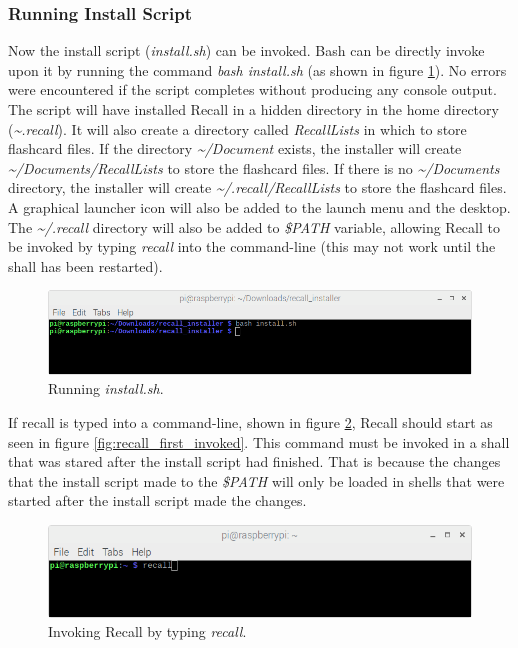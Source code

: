 \documentclass[letterpaper]{article}
\begin{document}
\subsubsection{Running Install Script} \label{running install script in terminal}
Now the install script (\textit{install.sh}) can be invoked. Bash can be directly invoke upon it by running the command \textit{bash install.sh} (as shown in figure \ref{fig:run_bash_install}). No errors were encountered if the script completes without producing any console output. The script will have installed Recall in a hidden directory in the home directory (\textit{\~{}.recall}). It will also create a directory called \textit{RecallLists} in which to store flashcard files. If the directory \textit{\~{}/Document} exists, the installer will create \textit{\~{}/Documents/RecallLists} to store the flashcard files. If there is no \textit{\~{}/Documents} directory, the installer will create \textit{\~{}/.recall/RecallLists} to store the flashcard files. A graphical launcher icon will also be added to the launch menu and the desktop. The \textit{\~{}/.recall} directory will also be added to \textit{\$PATH} variable, allowing Recall to be invoked by typing \textit{recall} into the command-line (this may not work until the shall has been restarted).

\begin{figure}[H]
  \centering
  \includegraphics[width=14cm]{images/command_line_install/run_install_script.png}
  \caption{Running \textit{install.sh}.}
  \label{fig:run_bash_install}
\end{figure}

  If recall is typed into a command-line, shown in figure \ref{fig:invoke_recall_command}, Recall should start as seen in figure \ref{fig:recall_first_invoked}. This command must be invoked in a shall that was stared after the install script had finished. That is because the changes that the install script made to the \textit{\$PATH} will only be loaded in shells that were started after the install script made the changes.

  \begin{figure}[H]
    \centering
    \includegraphics[width=14cm]{images/command_line_install/recall_command.png}
    \caption{Invoking Recall by typing \textit{recall}.}
    \label{fig:invoke_recall_command}
  \end{figure}
\end{document}
